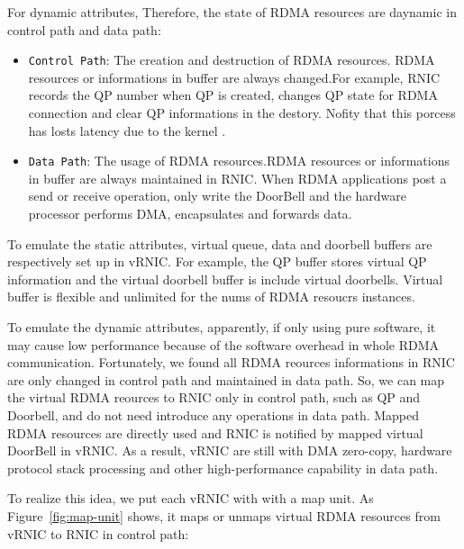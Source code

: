 For dynamic attributes, Therefore, the state of RDMA resources are daynamic in control path and data path:  

\begin{itemize}
\item {\verb|Control Path|}: The creation and destruction of RDMA resources. RDMA resources or informations in buffer are always changed.For example, RNIC records the QP number when QP is created, changes QP state for RDMA connection and clear QP informations in the destory. Nofity that this porcess has losts latency due to the kernel .
\item {\verb|Data Path|}: The usage of RDMA resources.RDMA resources or informations in buffer are always maintained in RNIC. When RDMA applications post a send or receive operation, only write the DoorBell and the hardware processor performs DMA, encapsulates and forwards data.
\end{itemize}

To emulate the static attributes, virtual queue, data and doorbell buffers are respectively set up in vRNIC. For example, the QP buffer stores virtual QP information and the virtual doorbell buffer is include virtual doorbells. Virtual buffer is flexible and unlimited for the nums of RDMA resoucrs instances. 

To emulate the dynamic attributes, apparently, if only using pure software, it may cause low performance because of the software overhead in whole RDMA communication. Fortunately, we found all RDMA reources informations in RNIC are only changed in control path and maintained in data path. So, we can map the virtual RDMA reources to RNIC only in control path, such as QP and Doorbell,  and do not need introduce any operations in data path. Mapped RDMA resources are directly used and RNIC is notified by mapped virtual DoorBell in vRNIC. As a result, vRNIC are still with DMA zero-copy, hardware protocol stack processing and other high-performance capability in data path.

To realize this idea, we put each vRNIC with with a map unit. As Figure~\ref{fig:map-unit} shows, it maps or unmaps virtual RDMA resources from vRNIC to RNIC in control path:


